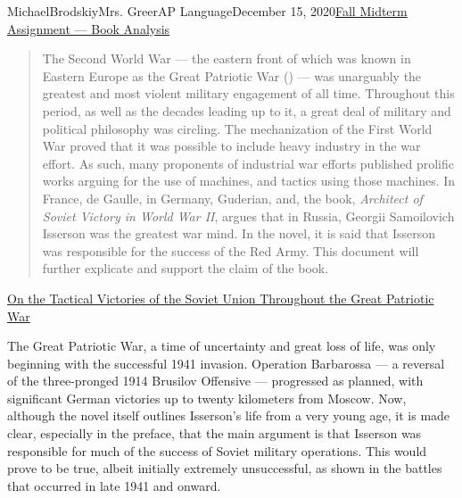\documentclass[12pt,letterpaper]{article}
\begin{document}
\begin{mla}{Michael}{Brodskiy}{Mrs. Greer}{AP Language}{December 15, 2020}{\underline{Fall Midterm Assignment — Book Analysis}} 

  \begin{abstract}
    \begin{justify}
      The Second World War — the eastern front of which was known in Eastern Europe as the Great Patriotic War (\textit{}) —  was unarguably the greatest and most violent military engagement of all time. Throughout this period, as well as the decades leading up to it, a great deal of military and political philosophy was circling. The mechanization of the First World War proved that it was possible to include heavy industry in the war effort. As such, many proponents of industrial war efforts published prolific works arguing for the use of machines, and tactics using those machines. In France, de Gaulle, in Germany, Guderian, and, the book, \textit{Architect of Soviet Victory in World War II}, argues that in Russia, Georgii Samoilovich Isserson was the greatest war mind. In the novel, it is said that Isserson was responsible for the success of the Red Army. This document will further explicate and support the claim of the book.
  \end{justify}
 \end{abstract}

 \begin{center}
   \underline{On the Tactical Victories of the Soviet Union Throughout the Great Patriotic War}
  \end{center}

  \begin{justify}
    \quad The Great Patriotic War, a time of uncertainty and great loss of life, was only beginning with the successful 1941 invasion. Operation Barbarossa — a reversal of the three-pronged 1914 Brusilov Offensive — progressed as planned, with significant German victories up to twenty kilometers from Moscow. Now, although the novel itself outlines Isserson's life from a very young age, it is made clear, especially in the preface, that the main argument is that Isserson was responsible for much of the success of Soviet military operations. This would prove to be true, albeit initially extremely unsuccessful, as shown in the battles that occurred in late 1941 and onward.
  \end{justify}


\end{mla}
\end{document}
